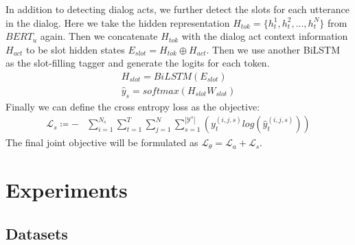\documentclass[a4paper]{article}
\begin{document}
In addition to detecting dialog acts, we further detect the slots for each utterance in the dialog. Here we take the hidden representation $H_{tok} = \{h_t^1, h_t^2, ..., h_t^N\}$ from $BERT_u$ again. Then we concatenate $H_{tok}$ with the dialog act context information $H_{act}$ to be slot hidden states $E_{slot} = H_{tok} \oplus H_{act}$. Then we use another BiLSTM as the slot-filling tagger and generate the logits for each token. 
\begin{align}
    H_{slot} = BiLSTM(E_{slot}) \\
    \hat{y}_s = softmax(H_{slot} W_{slot})
\end{align}
Finally we can define the cross entropy loss as the objective:
\begin{align}
    \mathcal{L}_s \coloneqq - &\sum_{i=1}^{N_s}\sum_{t=1}^{T}\sum_{j=1}^{N}\sum_{s=1}^{|\mathcal{Y}^s|} (y^{(i,j,s)}_t log (\hat{y}^{(i,j,s)}_t))
\end{align}
The final joint objective will be formulated as $\mathcal{L}_\theta = \mathcal{L}_a + \mathcal{L}_s$.



\section{Experiments}

\subsection{Datasets}
\end{document}
